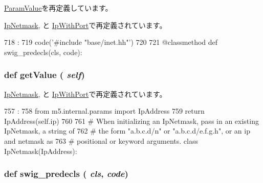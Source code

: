 \hyperlink{classm5_1_1params_1_1ParamValue_a0b408a11a14bd1d770e28f71a6e14ab5}{ParamValue}を再定義しています。

\hyperlink{classm5_1_1params_1_1IpNetmask_a0b408a11a14bd1d770e28f71a6e14ab5}{IpNetmask}, と \hyperlink{classm5_1_1params_1_1IpWithPort_a0b408a11a14bd1d770e28f71a6e14ab5}{IpWithPort}で再定義されています。


\begin{DoxyCode}
718                                :
719         code('#include "base/inet.hh"')
720 
721     @classmethod
    def swig_predecls(cls, code):
\end{DoxyCode}
\hypertarget{classm5_1_1params_1_1IpAddress_acc340fbd4335fa34f9d57fb454b28ed0}{
\subsubsection[{getValue}]{\setlength{\rightskip}{0pt plus 5cm}def getValue ( {\em self})}}
\label{classm5_1_1params_1_1IpAddress_acc340fbd4335fa34f9d57fb454b28ed0}


\hyperlink{classm5_1_1params_1_1IpNetmask_acc340fbd4335fa34f9d57fb454b28ed0}{IpNetmask}, と \hyperlink{classm5_1_1params_1_1IpWithPort_acc340fbd4335fa34f9d57fb454b28ed0}{IpWithPort}で再定義されています。


\begin{DoxyCode}
757                       :
758         from m5.internal.params import IpAddress
759         return IpAddress(self.ip)
760 
761 # When initializing an IpNetmask, pass in an existing IpNetmask, a string of
762 # the form "a.b.c.d/n" or "a.b.c.d/e.f.g.h", or an ip and netmask as
763 # positional or keyword arguments.
class IpNetmask(IpAddress):
\end{DoxyCode}
\hypertarget{classm5_1_1params_1_1IpAddress_ab3dbcf5716623eac67a8ccc074fa7e13}{
\subsubsection[{swig\_\-predecls}]{\setlength{\rightskip}{0pt plus 5cm}def swig\_\-predecls ( {\em cls}, \/   {\em code})}}
\label{classm5_1_1params_1_1IpAddress_ab3dbcf5716623eac67a8ccc074fa7e13}



